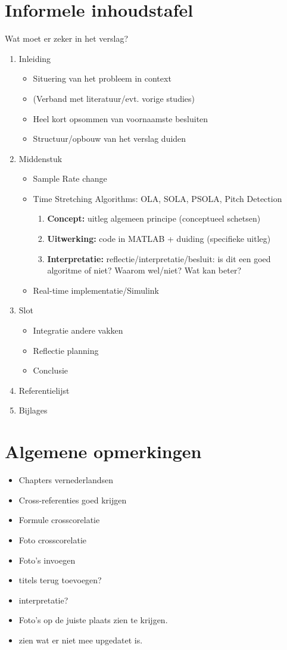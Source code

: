 \documentclass[12pt]{report}
\begin{document}
\section{Informele inhoudstafel}
Wat moet er zeker in het verslag?
\begin{enumerate}
\item Inleiding
\begin{itemize}
\item Situering van het probleem in context
\item (Verband met literatuur/evt. vorige studies)
\item Heel kort opsommen van voornaamste besluiten
\item Structuur/opbouw van het verslag duiden
\end{itemize}
\item Middenstuk
\begin{itemize}
\item Sample Rate change
\item Time Stretching Algorithms: OLA, SOLA, PSOLA, Pitch Detection
\begin{enumerate}
\item \textbf{Concept:} uitleg algemeen principe (conceptueel schetsen)
\item \textbf{Uitwerking:} code in MATLAB + duiding (specifieke uitleg)
\item \textbf{Interpretatie:} reflectie/interpretatie/besluit: is dit een goed algoritme of niet? Waarom wel/niet? Wat kan beter?
\end{enumerate}
\item Real-time implementatie/Simulink
\end{itemize}
\item Slot
\begin{itemize}
\item Integratie andere vakken
\item Reflectie planning
\item Conclusie
\end{itemize}
\item Referentielijst
\item Bijlages
\end{enumerate}

\section{Algemene opmerkingen}
\begin{itemize}
\item Chapters vernederlandsen
\item Cross-referenties goed krijgen
\item Formule crosscorelatie
\item Foto crosscorelatie
\item Foto's invoegen
\item titels terug toevoegen?
\item interpretatie?
\item Foto's op de juiste plaats zien te krijgen.
\item zien wat er niet mee upgedatet is.

\end{itemize}
\end{document}
